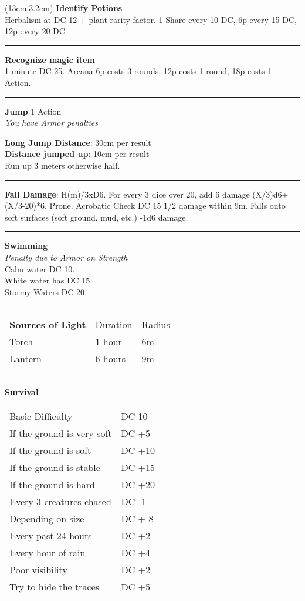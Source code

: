 \documentclass[a4paper,12 pt,openany]{book}
\newcommand{\linex}{\rule{\textwidth}{0.4pt}}
\begin{document}
\begin{textblock*}{7cm}(13cm,3.2cm) %
\textbf{Identify Potions}\\
Herbalism at DC 12 + plant rarity factor. 1 Share every 10 DC, 6p every 15 DC, 12p every 20 DC

\linex

\textbf{Recognize magic item}\\
1 minute DC 25. Arcana 6p costs 3 rounds, 12p costs 1 round, 18p costs 1 Action.

\linex

\textbf{Jump} 1 Action\\
\textit{You have Armor penalties}

\textbf{Long Jump Distance}: 30cm per result\\

\textbf{Distance jumped up}: 10cm per result\\

Run up 3 meters otherwise half.

\linex

\textbf{Fall Damage}: H(m)/3xD6. For every 3 dice over 20, add 6 damage (X/3)d6+(X/3-20)*6. Prone. Acrobatic Check DC 15 1/2 damage within 9m. Falls onto soft surfaces (soft ground, mud, etc.) -1d6 damage.

\linex

\textbf{Swimming}\\
\textit{Penalty due to Armor on Strength}\\
Calm water DC 10.\\
White water has DC 15\\
Stormy Waters DC 20

\linex

\begin{tabular}{lll}
\textbf{Sources of Light} & Duration&Radius\\
Torch& 1 hour & 6m\\
Lantern & 6 hours & 9m\\
\end{tabular}

\linex


\textbf{Survival}
\begin{tabular}{ll}
Basic Difficulty & DC 10\\
If the ground is very soft& DC +5\\
If the ground is soft& DC +10\\
If the ground is stable& DC +15\\
If the ground is hard& DC +20\\
Every 3 creatures chased& DC -1\\
Depending on size & DC +-8\\
Every past 24 hours&DC +2\\
Every hour of rain&DC +4\\
Poor visibility&DC +2\\
Try to hide the traces&DC +5\\
\end{tabular}\\


\end{textblock*}
\end{document}
